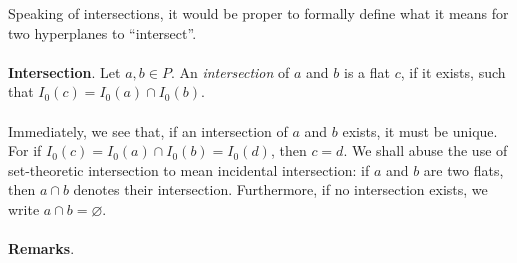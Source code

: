 \documentclass[12pt]{article}
\begin{document}
Speaking of intersections, it would be proper to formally define what it means for two hyperplanes to ``intersect''.
\\\\
\textbf{Intersection}.  Let $a,b\in P$.  An \emph{intersection} of $a$ and $b$ is a flat $c$, if it exists, such that $I_0(c)=I_0(a)\cap I_0(b)$.
\\\\
Immediately, we see that, if an intersection of $a$ and $b$ exists, it must be unique.  For if $I_0(c)=I_0(a)\cap I_0(b)=I_0(d)$, then $c=d$.  We shall abuse the use of set-theoretic intersection to mean incidental intersection: if $a$ and $b$ are two flats, then $a\cap b$ denotes their intersection.  Furthermore, if no intersection exists, we write $a\cap b=\varnothing$.
\\\\
\textbf{Remarks}.
\end{document}
